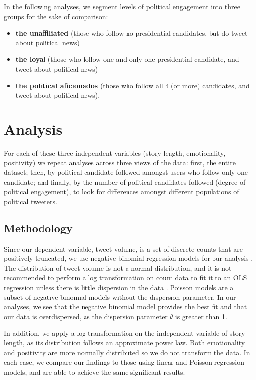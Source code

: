 \documentclass[letterpaper]{article}
\begin{document}
In the following analyses, we segment levels of political engagement into three groups for the sake of comparison:

\begin{itemize}
  \item \textbf{the unaffiliated} (those who follow no presidential candidates, but do tweet about political news)
  \item \textbf{the loyal} (those who follow one and only one presidential candidate, and tweet about political news)
  \item \textbf{the political aficionados} (those who follow all 4 (or more) candidates, and tweet about political news).
\end{itemize}


\section{Analysis} 
For each of these three independent variables (story length, emotionality, positivity) we repeat analyses across three views of the data: first, the entire dataset; then, by political candidate followed amongst users who follow only one candidate; and finally, by the number of political candidates followed (degree of political engagement), to look for differences amongst different populations of political tweeters.


\subsection{Methodology}

Since our dependent variable, tweet volume, is a set of discrete counts that are positively truncated, we use negative binomial regression models for our analysis \cite{scott1997regression}. The distribution of tweet volume is not a normal distribution, and it is not recommended to perform a log transformation on count data to fit it to an OLS regression unless there is little dispersion in the data \cite{o2010not}. Poisson models are a subset of negative binomial models without the dispersion parameter. In our analyses, we see that the negative binomial model provides the best fit and that our data is overdispersed, as the dispersion parameter $\theta$ is greater than 1.   

In addition, we apply a log transformation on the independent variable of story length, as its distribution follows an approximate power law. Both emotionality and positivity are more normally distributed so we do not transform the data.
In each case, we compare our findings to those using linear and Poisson regression models, and are able to achieve the same significant results. 
\end{document}
